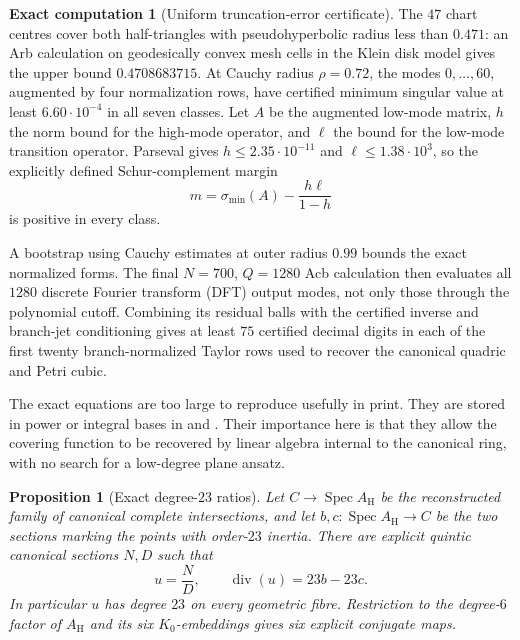 \documentclass[11pt]{amsart}
\newtheorem{proposition}[proposition]{Proposition}
\theoremstyle{definition}
\newtheorem{computation}[computation]{Exact computation}
\theoremstyle{remark}
\begin{document}
\begin{computation}[Uniform truncation-error certificate]
\label{comp:hurwitz-tail}
The $47$ chart centres cover both half-triangles with pseudohyperbolic radius
less than $0.471$: an Arb calculation \cite{JohanssonArb} on geodesically
convex mesh cells in
the Klein disk model gives the upper bound $0.4708683715$.  At Cauchy radius $\rho=0.72$, the
modes $0,\ldots,60$, augmented by four normalization rows, have certified
minimum singular value at least $6.60\cdot10^{-4}$ in all seven classes.
Let $A$ be the augmented low-mode matrix, $h$ the norm bound for the
high-mode operator, and $\ell$ the bound for the low-mode transition
operator.  Parseval gives
$h\leq2.35\cdot10^{-11}$ and $\ell\leq1.38\cdot10^3$, so the explicitly
defined Schur-complement margin
\[
 m=\sigma_{\min}(A)-\frac{h\ell}{1-h}
\]
is positive in every class.

A bootstrap using Cauchy estimates at outer radius $0.99$ bounds the exact
normalized forms.
The final $N=700$, $Q=1280$ Acb calculation then evaluates all $1280$
discrete Fourier transform (DFT) output modes, not only those through the
polynomial cutoff.  Combining its
residual balls with the certified inverse and branch-jet conditioning gives
at least $75$ certified decimal digits in each of the first twenty
branch-normalized Taylor rows used to recover the canonical quadric and Petri
cubic.
\end{computation}

The exact equations are too large to reproduce usefully in print.  They are
stored in power or integral bases in
 and
.  Their importance here is that
they allow the covering function to be recovered by linear algebra internal
to the canonical ring, with no search for a low-degree plane ansatz.

\begin{proposition}[Exact degree-$23$ ratios]
\label{prop:hurwitz-maps}
Let $C\to\operatorname{Spec}A_{\mathrm H}$ be the reconstructed family of
canonical complete intersections, and let
$b,c:\operatorname{Spec}A_{\mathrm H}\to C$ be the two sections marking
the points with order-$23$ inertia.
There are explicit quintic canonical sections $N,D$ such that
\[
 u=\frac ND,
 \qquad \operatorname{div}(u)=23b-23c.
\]
In particular $u$ has degree $23$ on every geometric fibre.  Restriction to
the degree-$6$ factor of $A_{\mathrm H}$ and its six $K_0$-embeddings gives
six explicit conjugate maps.
\end{proposition}
\end{document}
